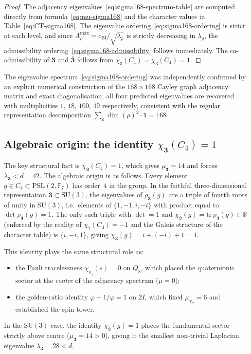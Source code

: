 \documentclass[11pt,a4paper]{article}
\begin{document}
    \begin{proof}
      The adjacency eigenvalues~\eqref{eq:sigma168-spectrum-table} are computed directly
      from formula~\eqref{eq:mu-sigma168} and the character values in
      Table~\eqref{eq:CT-sigma168}.
      The eigenvalue ordering~\eqref{eq:sigma168-ordering} is strict at each level, and since
      $A^{\max}_\rho = c_{\mathrm{BI}}/\sqrt{\lambda_\rho}$ is strictly decreasing in $\lambda_\rho$,
      the admissibility ordering~\eqref{eq:sigma168-admissibility} follows immediately.
      The co-admissibility of $\mathbf{3}$ and $\bar{\mathbf{3}}$ follows from
      $\chi_3(C_4) = \chi_{\bar 3}(C_4) = 1$.
    \end{proof}

    \noindent
    The eigenvalue spectrum~\eqref{eq:sigma168-ordering} was independently confirmed
    by an explicit numerical construction of the $168 \times 168$ Cayley graph adjacency
    matrix and exact diagonalisation; all four predicted eigenvalues are recovered with
    multiplicities $1$, $18$, $100$, $49$ respectively, consistent with the regular
    representation decomposition $\sum_\rho \dim(\rho)^2 \cdot \mathbf{1} = 168$.

  \subsection{Algebraic origin: the identity $\chi_{\mathbf{3}}(C_4) = 1$}
    \label{sec:sigma168-origin}

    The key structural fact is $\chi_{\mathbf{3}}(C_4) = 1$, which gives $\mu_{\mathbf{3}} = 14$
    and forces $\lambda_{\mathbf{3}} < d = 42$.
    The algebraic origin is as follows.
    Every element $g \in C_4 \subset \mathrm{PSL}(2,\mathbb{F}_7)$ has order~$4$ in the
    group.
    In the faithful three-dimensional representation $\mathbf{3} \subset \mathrm{SU}(3)$, the
    eigenvalues of $\rho_{\mathbf{3}}(g)$ are a triple of fourth roots of unity in
    $\mathrm{SU}(3)$, i.e.\ elements of $\{1, -1, i, -i\}$ with product equal to
    $\det\rho_{\mathbf{3}}(g) = 1$.
    The only such triple with $\det = 1$ and $\chi_{\mathbf{3}}(g) = \mathrm{tr}\,\rho_{\mathbf{3}}(g)
    \in \mathbb{R}$ (enforced by the reality of $\chi_7(C_4) = -1$ and the Galois structure of
    the character table) is $\{i, -i, 1\}$, giving $\chi_{\mathbf{3}}(g) = i + (-i) + 1 = 1$.

    This identity plays the same structural role as:
    \begin{itemize}
      \item the Pauli tracelessness $\chi_{\rho_4}(s) = 0$ on $Q_8$, which placed the
      quaternionic sector at the \emph{centre} of the adjacency spectrum ($\mu = 0$);
      \item the golden-ratio identity $\varphi - 1/\varphi = 1$ on $2I$, which fixed
      $\mu_{\chi_2} = 6$ and established the spin tower.
    \end{itemize}
    In the $\mathrm{SU}(3)$ case, the identity $\chi_{\mathbf{3}}(g) = 1$ places the
    fundamental sector strictly above centre ($\mu_{\mathbf{3}} = 14 > 0$), giving it the
    smallest non-trivial Laplacian eigenvalue $\lambda_{\mathbf{3}} = 28 < d$.
\end{document}
